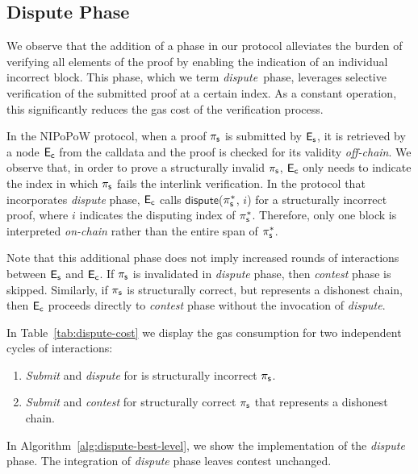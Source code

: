 

\newcommand{\dispute}{\emph{dispute\ }}

\subsection{Dispute Phase} We observe that the addition of a phase in
our protocol alleviates the burden of verifying all elements of the proof by
enabling the indication of an individual incorrect block. This phase, which we
term \dispute phase, leverages selective verification of the submitted proof at
a certain index. As a constant operation, this significantly reduces the gas
cost of the verification process.

In the NIPoPoW protocol, when a proof $\mathsf{\pi_{s}}$ is submitted by $\mathsf{E_{s}}$, it is
retrieved by a node $\mathsf{E_{c}}$ from the calldata and the proof is checked for its
validity \emph{off-chain}. We observe that, in
order to prove a structurally invalid $\mathsf{\pi_{s}}$, $\mathsf{E_{c}}$ only needs to
indicate the index in which $\mathsf{\pi_{s}}$ fails the interlink verification. In the
protocol that incorporates \emph{dispute} phase, $\mathsf{E_{c}}$ calls
$\textsf{dispute}$($\mathsf{\pi_{s}^*}$, $i$) for a structurally incorrect proof, where $i$
indicates the disputing index of $\mathsf{\pi_{s}^*}$. Therefore, only one block is
interpreted \emph{on-chain} rather than the entire span of $\mathsf{\pi_{s}^*}$.

Note that this additional phase does not imply increased rounds of
interactions between $\mathsf{E_{s}}$ and $\mathsf{E_{c}}$. If $\mathsf{\pi_{s}}$ is invalidated in
\emph{dispute} phase, then \emph{contest} phase is skipped. Similarly, if
$\mathsf{\pi_{s}}$ is structurally correct, but represents a dishonest chain, then $\mathsf{E_{c}}$
proceeds directly to \emph{contest} phase without the invocation of \emph{dispute}.



In Table~\ref{tab:dispute-cost} we display the gas consumption for
two independent cycles of interactions:
\begin{enumerate}
    \item \emph{Submit} and \emph{dispute} for is structurally incorrect
        $\mathsf{\pi_{s}}$.
    \item \emph{Submit} and \emph{contest} for structurally correct
        $\mathsf{\pi_{s}}$ that represents a dishonest chain.
\end{enumerate}

\noindent In Algorithm~\ref{alg:dispute-best-level}, we show the implementation
of the \emph{dispute} phase. The integration of \emph{dispute} phase leaves
\textsf{contest} unchanged.

